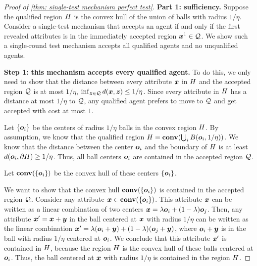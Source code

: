 \begin{proof}[Proof of \cref{thm: single-test mechanism perfect test}]
    
    
    \textbf{Part 1: sufficiency.}
    Suppose the qualified region $H$ is the convex hull of the union of balls with radius $1/\eta$. Consider a single-test mechanism that accepts an agent if and only if the first revealed attributes is in the immediately accepted region $\boldsymbol{x}^1 \in \mathcal{Q}$.
    We show such a single-round test mechanism accepts all qualified agents and no unqualified agents.  
    
    \textbf{Step 1: this mechanism accepts every qualified agent.} 
    To do this, we only need to show that the distance between every attribute $\boldsymbol{x}$ in $H$ and the accepted region $\mathcal{Q}$ is at most $1/\eta$, $\inf_{\boldsymbol{z} \in \mathcal{Q}} d(\boldsymbol{x},\boldsymbol{z}) \leq 1/\eta$. 
    Since every attribute in $H$ has a distance at most $1/\eta$ to $\mathcal{Q}$, any qualified agent prefers to move to $\mathcal{Q}$ and get accepted with cost at most $1$.  
    
    Let $\{\boldsymbol{o}_i\}$ be the centers of radius $1/\eta$ balls in the convex region $H$. 
    By assumption, we know that the qualified region $H = \textbf{conv}(\bigcup_{i} B(\boldsymbol{o}_i, 1/\eta))$.
    We know that the distance between the center $\boldsymbol{o}_i$ and the boundary of $H$ is at least $d(\boldsymbol{o}_i,\partial H) \geq 1/\eta$. Thus, all ball centers $\boldsymbol{o}_i$ are contained in the accepted region $\mathcal{Q}$. 
    
    Let $\textbf{conv}(\{\boldsymbol{o}_i\})$ be the convex hull of these centers $\{\boldsymbol{o}_i\}$.

    We want to show that the convex hull $\textbf{conv}(\{\boldsymbol{o}_i\})$ is contained in the accepted region $\mathcal{Q}$.
    Consider any attribute $\boldsymbol{x} \in \textbf{conv}(\{\boldsymbol{o}_i\})$.
    This attribute $\boldsymbol{x}$ can be written as a linear combination of two centers $\boldsymbol{x} = \lambda \boldsymbol{o}_i + (1-\lambda)\boldsymbol{o}_j$. Then, any attribute $\boldsymbol{x}' = \boldsymbol{x} + \boldsymbol{y}$ in the ball centered at $\boldsymbol{x}$ with radius $1/\eta$ can be written as the linear combination $\boldsymbol{x}' = \lambda(\boldsymbol{o}_i + \boldsymbol{y}) + (1-\lambda) (\boldsymbol{o}_j + \boldsymbol{y})$, where $\boldsymbol{o}_i + \boldsymbol{y}$ is in the ball with radius $1/\eta$ centered at $\boldsymbol{o}_i$. 
    We conclude that this attribute $\boldsymbol{x}'$ is contained in $H$, because the region $H$ is the convex hull of these balls centered at $\boldsymbol{o}_i$. Thus, the ball centered at $\boldsymbol{x}$ with radius $1/\eta$ is contained in the region $H$. 
    

\end{proof}
